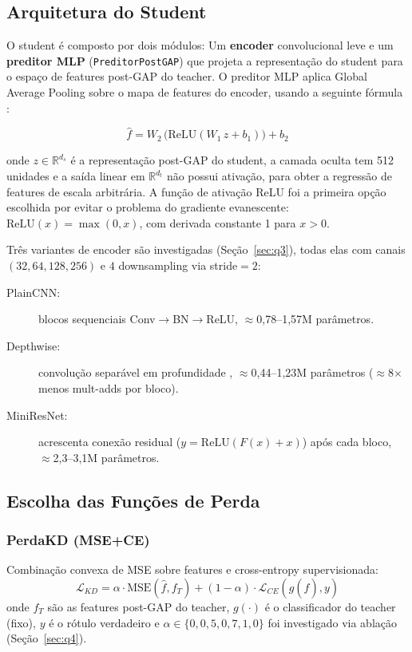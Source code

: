 \documentclass[
  article,            %
  11pt,               %
  letterpaper,        %
  oneside,            %
  sumario = tradicional
]{abntex2}
\begin{document}
\subsection{Arquitetura do Student}

O student é composto por dois módulos: Um \textbf{encoder} convolucional leve
e um \textbf{preditor MLP} (\texttt{PreditorPostGAP}) que projeta a
representação do student para o espaço de features post-GAP do teacher. O preditor MLP aplica Global Average Pooling sobre o mapa de features do encoder, usando a seguinte fórmula : 

\begin{equation}
  \hat{f} = W_2\,\bigl(\mathrm{ReLU}(W_1\,z + b_1)\bigr) + b_2
  \label{eq:mlp}
\end{equation}

onde $z \in \mathbb{R}^{d_s}$ é a representação post-GAP do student, a camada
oculta tem 512 unidades e a saída linear em $\mathbb{R}^{d_t}$ não possui
ativação, para obter a regressão de features de escala arbitrária.
A função de ativação ReLU foi a primeira opção escolhida por evitar o problema do gradiente
evanescente: $\mathrm{ReLU}(x) = \max(0, x)$, com derivada constante 1 para
$x > 0$.

Três variantes de encoder são investigadas (Seção~\ref{sec:q3}), todas elas com
canais $(32, 64, 128, 256)$ e $4$ downsampling via stride$=2$:

\begin{description}
  \item[PlainCNN:] blocos sequenciais Conv$\to$BN$\to$ReLU,  $\approx$0,78--1,57M parâmetros.
  \item[Depthwise:] convolução separável em profundidade \cite{howard2017mobilenets},
    $\approx$0,44--1,23M parâmetros ($\approx$8$\times$ menos mult-adds por bloco).
  \item[MiniResNet:] acrescenta conexão residual ($y = \mathrm{ReLU}(F(x)+x)$)
    após cada bloco, $\approx$2,3--3,1M parâmetros.
\end{description}

\subsection{Escolha das Funções de Perda}

\subsubsection{PerdaKD (MSE+CE)}
Combinação convexa de MSE sobre features e cross-entropy supervisionada:
\\
\begin{equation}
  \mathcal{L}_{KD} = \alpha \cdot \mathrm{MSE}(\hat{f}, f_T)
                   + (1-\alpha) \cdot \mathcal{L}_{CE}(g(\hat{f}), y)
  \label{eq:perdakd}
\end{equation}
onde $f_T$ são as features post-GAP do teacher, $g(\cdot)$ é o classificador
do teacher (fixo), $y$ é o rótulo verdadeiro e $\alpha \in \{0, 0{,}5, 0{,}7, 1{,}0\}$
foi investigado via ablação (Seção~\ref{sec:q4}).
\end{document}
